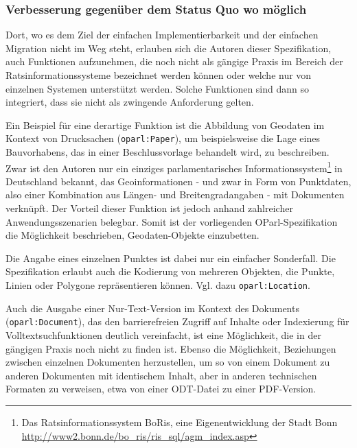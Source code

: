 \documentclass[,a4paper]{article}
\begin{document}
\subsubsection{Verbesserung gegenüber dem Status Quo wo
möglich}\label{verbesserung-gegenuxfcber-dem-status-quo-wo-muxf6glich}

Dort, wo es dem Ziel der einfachen Implementierbarkeit und der einfachen
Migration nicht im Weg steht, erlauben sich die Autoren dieser
Spezifikation, auch Funktionen aufzunehmen, die noch nicht als gängige
Praxis im Bereich der Ratsinformationssysteme bezeichnet werden können
oder welche nur von einzelnen Systemen unterstützt werden. Solche
Funktionen sind dann so integriert, dass sie nicht als zwingende
Anforderung gelten.

Ein Beispiel für eine derartige Funktion ist die Abbildung von Geodaten
im Kontext von Drucksachen (\texttt{oparl:Paper}), um beispielsweise die
Lage eines Bauvorhabens, das in einer Beschlussvorlage behandelt wird,
zu beschreiben. Zwar ist den Autoren nur ein einziges parlamentarisches
Informationssystem\footnote{Das Ratsinformationssystem BoRis, eine
  Eigenentwicklung der Stadt Bonn
  \url{http://www2.bonn.de/bo_ris/ris_sql/agm_index.asp}} in Deutschland
bekannt, das Geoinformationen - und zwar in Form von Punktdaten, also
einer Kombination aus Längen- und Breitengradangaben - mit Dokumenten
verknüpft. Der Vorteil dieser Funktion ist jedoch anhand zahlreicher
Anwendungsszenarien belegbar. Somit ist der vorliegenden
OParl-Spezifikation die Möglichkeit beschrieben, Geodaten-Objekte
einzubetten.

Die Angabe eines einzelnen Punktes ist dabei nur ein einfacher
Sonderfall. Die Spezifikation erlaubt auch die Kodierung von mehreren
Objekten, die Punkte, Linien oder Polygone repräsentieren können. Vgl.
dazu \texttt{oparl:Location}.

Auch die Ausgabe einer Nur-Text-Version im Kontext des Dokuments
(\texttt{oparl:Document}), das den barrierefreien Zugriff auf Inhalte
oder Indexierung für Volltextsuchfunktionen deutlich vereinfacht, ist
eine Möglichkeit, die in der gängigen Praxis noch nicht zu finden ist.
Ebenso die Möglichkeit, Beziehungen zwischen einzelnen Dokumenten
herzustellen, um so von einem Dokument zu anderen Dokumenten mit
identischem Inhalt, aber in anderen technischen Formaten zu verweisen,
etwa von einer ODT-Datei zu einer PDF-Version.

\end{document}
